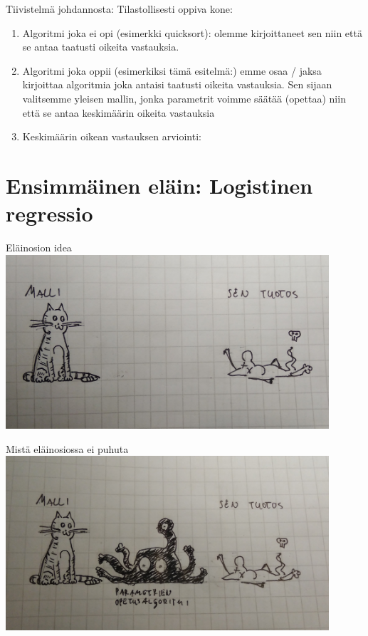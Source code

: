 \documentclass[presentation]{beamer}
\begin{document}
\begin{frame}{Tiivistelmä johdannosta:}
    Tilastollisesti oppiva kone:
    \pause
    \begin{enumerate}
        \item Algoritmi joka ei opi (esimerkki quicksort): olemme kirjoittaneet sen niin että se antaa taatusti oikeita vastauksia.
        \item Algoritmi joka oppii (esimerkiksi tämä esitelmä:) emme osaa / jaksa kirjoittaa algoritmia joka antaisi taatusti oikeita vastauksia.
        Sen sijaan valitsemme yleisen mallin, jonka parametrit voimme säätää (opettaa) niin että se antaa keskimäärin oikeita vastauksia
        \item Keskimäärin oikean vastauksen arviointi:
    \end{enumerate}
    
\end{frame}


\section{Ensimmäinen eläin: Logistinen regressio}

\begin{frame}{}
  \tableofcontents[currentsection]
\end{frame}

\begin{frame}{Eläinosion idea}
    \includegraphics[width=0.9\textwidth]{malli_tuotos.jpg}
\end{frame}

\begin{frame}{Mistä eläinosiossa ei puhuta}
        \includegraphics[width=0.9\textwidth]{malli_tuotos_optimointi.jpg}

\end{frame}
\end{document}
